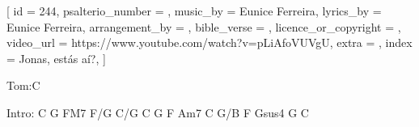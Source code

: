 
[
    id                     = {244},
    psalterio_number       = {},
    music_by               = {Eunice Ferreira},
    lyrics_by              = {Eunice Ferreira},
    arrangement_by         = {},
    bible_verse            = {},
    licence_or_copyright   = {},
    video_url              = {https://www.youtube.com/watch?v=pLiAfoVUVgU},
    extra                  = {},
    index                  = {Jonas, estás aí?},
]


\beginchorus

Tom:C

Intro: C G FM7 F/G C/G
       C G F Am7
       C G/B  F Gsus4 G C

